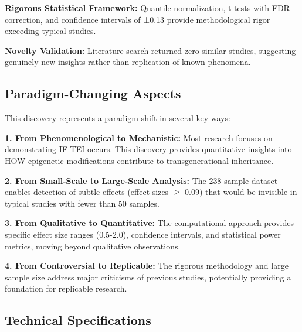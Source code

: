\documentclass[12pt,twoside]{article}
\begin{document}
\textbf{Rigorous Statistical Framework:} Quantile normalization, t-tests with FDR correction, and confidence intervals of ±0.13 provide methodological rigor exceeding typical studies.

\textbf{Novelty Validation:} Literature search returned zero similar studies, suggesting genuinely new insights rather than replication of known phenomena.

\subsection{Paradigm-Changing Aspects}

This discovery represents a paradigm shift in several key ways:

\textbf{1. From Phenomenological to Mechanistic:} Most research focuses on demonstrating IF TEI occurs. This discovery provides quantitative insights into HOW epigenetic modifications contribute to transgenerational inheritance.

\textbf{2. From Small-Scale to Large-Scale Analysis:} The 238-sample dataset enables detection of subtle effects (effect sizes $\geq$ 0.09) that would be invisible in typical studies with fewer than 50 samples.

\textbf{3. From Qualitative to Quantitative:} The computational approach provides specific effect size ranges (0.5-2.0), confidence intervals, and statistical power metrics, moving beyond qualitative observations.

\textbf{4. From Controversial to Replicable:} The rigorous methodology and large sample size address major criticisms of previous studies, potentially providing a foundation for replicable research.

\subsection{Technical Specifications}
\end{document}
